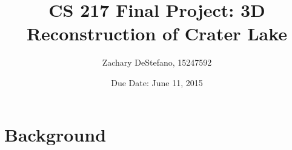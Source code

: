 \documentclass[11pt,psfig]{article}
\begin{document}
\setlength{\parskip}{1.2ex plus0.3ex minus 0.3ex}


\thispagestyle{empty} \pagestyle{myheadings} 

\title{CS 217 Final Project: 3D Reconstruction of Crater Lake}
\author{Zachary DeStefano, 15247592}
\date{Due Date: June 11, 2015}

\maketitle

\vfill\eject

\newpage

\section{Background}
\end{document}
